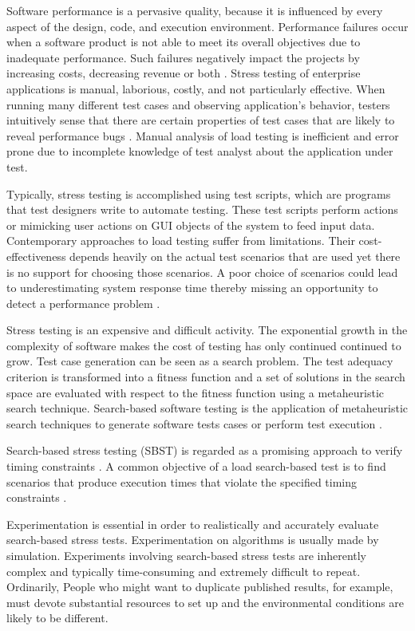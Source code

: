 \documentclass[espaco=umemeio,chapter=TITLE,twoside,openright]{abnt}
\begin{document}
Software performance is a pervasive quality,  because it is influenced by every aspect of the design, code, and execution environment. Performance failures occur when a software product is not able to meet its overall objectives due to inadequate performance. Such failures negatively impact the projects by increasing costs, decreasing revenue or both \cite{Vetoio2011}. Stress testing of enterprise applications is manual, laborious, costly, and not particularly effective. When running many different test cases and observing application’s behavior, testers intuitively sense that there are certain properties of test cases that are likely to reveal performance bugs \cite{Grechanik2012}. Manual analysis of load testing is inefficient and error prone due to incomplete knowledge of test analyst about the application under test\cite{Arslan2015}.

Typically, stress testing is accomplished using test scripts, which are programs that test designers write to automate testing. These test scripts perform actions or mimicking user actions on GUI objects of the system to feed input data. Contemporary approaches to load testing suffer from limitations. Their cost-effectiveness depends heavily on the actual test scenarios that are used yet there is no support for choosing those scenarios. A poor choice of scenarios could lead to underestimating system response time thereby missing an opportunity to detect a performance problem \cite{Grechanik2012}.


Stress testing is an expensive and difficult activity. The exponential
growth in the complexity of software makes the cost of testing has only continued continued to grow. Test case generation can be seen as a search problem. The test adequacy criterion is transformed into a fitness function and a set of solutions in the search
space are evaluated with respect to the fitness function using a metaheuristic search technique. Search-based software testing is the application of metaheuristic search techniques to generate software
tests cases or perform test execution \cite{Afzal2009a}.

Search-based stress testing (SBST) is regarded as a promising approach to verify timing constraints \cite{Afzal2009a}. A common objective of a load search-based test is to find  scenarios that produce execution times that violate the specified timing constraints \cite{Sullivan}. 

Experimentation is essential in order to realistically and accurately evaluate search-based stress tests. Experimentation on algorithms is usually made by simulation. Experiments involving search-based stress tests are inherently complex and typically time-consuming and extremely difficult to repeat. Ordinarily, People who might want to duplicate published results, for example, must devote substantial resources to set up and the environmental conditions are likely to be different.
\end{document}
